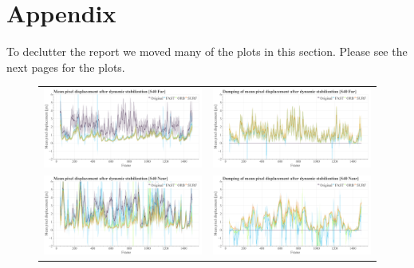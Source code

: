 
\newpage

\section{Appendix}
\label{sec:appendix}
To declutter the report we moved many of the plots in this section.
Please see the next pages for the plots.

\begin{figure}[!ht]
  \centering
    \begin{tabular}{cc}
      \includegraphics[width=0.475\linewidth]{diagrams/optical_flow/mean_pixel_shifts_after_dynamic_stabilization_s40_far.png}    &  
      \includegraphics[width=0.475\linewidth]{diagrams/optical_flow/damping_mean_pixel_shifts_after_dynamic_stabilization_s40_far.png}   \\ 

      \includegraphics[width=0.475\linewidth]{diagrams/optical_flow/mean_pixel_shifts_after_dynamic_stabilization_s40_near.png}    &  
      \includegraphics[width=0.475\linewidth]{diagrams/optical_flow/damping_mean_pixel_shifts_after_dynamic_stabilization_s40_near.png}      \\


\end{tabular}
\end{figure}

